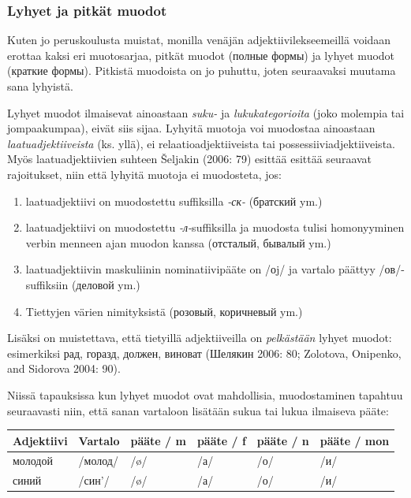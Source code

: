 \documentclass[]{scrartcl}
\providecommand{\tightlist}{%
  \setlength{\itemsep}{0pt}\setlength{\parskip}{0pt}}
\begin{document}
\subsubsection{Lyhyet ja pitkät
muodot}\label{lyhyet-ja-pitkuxe4t-muodot}

Kuten jo peruskoulusta muistat, monilla venäjän adjektiivilekseemeillä
voidaan erottaa kaksi eri muotosarjaa, pitkät muodot (полные формы) ja
lyhyet muodot (краткие формы). Pitkistä muodoista on jo puhuttu, joten
seuraavaksi muutama sana lyhyistä.

Lyhyet muodot ilmaisevat ainoastaan \emph{suku-} ja
\emph{lukukategorioita} (joko molempia tai jompaakumpaa), eivät siis
sijaa. Lyhyitä muotoja voi muodostaa ainoastaan
\emph{laatuadjektiiveista} (ks. yllä), ei relaatioadjektiiveista tai
possessiiviadjektiiveista. Myös laatuadjektiivien suhteen Šeljakin
(2006: 79) esittää esittää seuraavat rajoitukset, niin että lyhyitä
muotoja ei muodosteta, jos:

\begin{enumerate}
\def\labelenumi{\arabic{enumi}.}
\tightlist
\item
  laatuadjektiivi on muodostettu suffiksilla \emph{-ск-} (братский ym.)
\item
  laatuadjektiivi on muodostettu \emph{-л-}suffiksilla ja muodosta
  tulisi homonyyminen verbin menneen ajan muodon kanssa (отсталый,
  бывалый ym.)
\item
  laatuadjektiivin maskuliinin nominatiivipääte on /оj/ ja vartalo
  päättyy /ов/-suffiksiin (деловой ym.)
\item
  Tiettyjen värien nimityksistä (розовый, коричневый ym.)
\end{enumerate}

Lisäksi on muistettava, että tietyillä adjektiiveilla on
\emph{pelkästään} lyhyet muodot: esimerkiksi рад, горазд, должен,
виноват (Шелякин 2006: 80; Zolotova, Onipenko, and Sidorova 2004: 90).

Niissä tapauksissa kun lyhyet muodot ovat mahdollisia, muodostaminen
tapahtuu seuraavasti niin, että sanan vartaloon lisätään sukua tai lukua
ilmaiseva pääte:

\begin{longtable}[c]{@{}llllll@{}}
\toprule
Adjektiivi & Vartalo & pääte / m & pääte / f & pääte / n & pääte /
mon\tabularnewline
\midrule
\endhead
молодой & /молод/ & /ø/ & /а/ & /о/ & /и/\tabularnewline
синий & /син'/ & /ø/ & /а/ & /о/ & /и/\tabularnewline
\bottomrule
\end{longtable}
\end{document}
